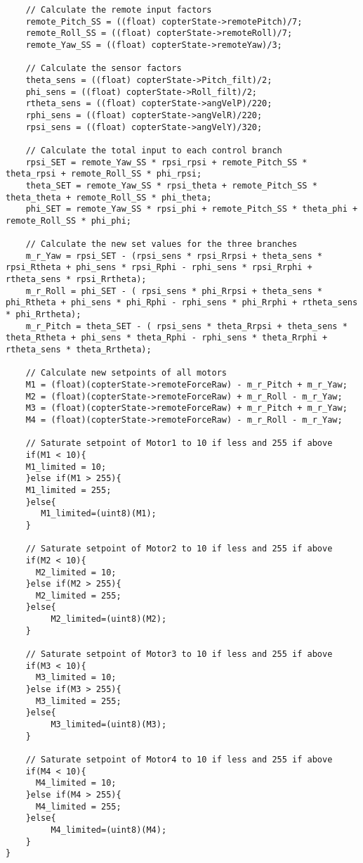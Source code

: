 \begin{lstlisting}
    // Calculate the remote input factors
    remote_Pitch_SS = ((float) copterState->remotePitch)/7;
    remote_Roll_SS = ((float) copterState->remoteRoll)/7;
    remote_Yaw_SS = ((float) copterState->remoteYaw)/3;

    // Calculate the sensor factors
    theta_sens = ((float) copterState->Pitch_filt)/2;
    phi_sens = ((float) copterState->Roll_filt)/2;
    rtheta_sens = ((float) copterState->angVelP)/220;
    rphi_sens = ((float) copterState->angVelR)/220;
    rpsi_sens = ((float) copterState->angVelY)/320;

    // Calculate the total input to each control branch
    rpsi_SET = remote_Yaw_SS * rpsi_rpsi + remote_Pitch_SS * theta_rpsi + remote_Roll_SS * phi_rpsi;
    theta_SET = remote_Yaw_SS * rpsi_theta + remote_Pitch_SS * theta_theta + remote_Roll_SS * phi_theta;
    phi_SET = remote_Yaw_SS * rpsi_phi + remote_Pitch_SS * theta_phi + remote_Roll_SS * phi_phi;

    // Calculate the new set values for the three branches
    m_r_Yaw = rpsi_SET - (rpsi_sens * rpsi_Rrpsi + theta_sens * rpsi_Rtheta + phi_sens * rpsi_Rphi - rphi_sens * rpsi_Rrphi + rtheta_sens * rpsi_Rrtheta);
    m_r_Roll = phi_SET - ( rpsi_sens * phi_Rrpsi + theta_sens * phi_Rtheta + phi_sens * phi_Rphi - rphi_sens * phi_Rrphi + rtheta_sens * phi_Rrtheta);
    m_r_Pitch = theta_SET - ( rpsi_sens * theta_Rrpsi + theta_sens * theta_Rtheta + phi_sens * theta_Rphi - rphi_sens * theta_Rrphi + rtheta_sens * theta_Rrtheta);

    // Calculate new setpoints of all motors
    M1 = (float)(copterState->remoteForceRaw) - m_r_Pitch + m_r_Yaw;
    M2 = (float)(copterState->remoteForceRaw) + m_r_Roll - m_r_Yaw;
    M3 = (float)(copterState->remoteForceRaw) + m_r_Pitch + m_r_Yaw;
    M4 = (float)(copterState->remoteForceRaw) - m_r_Roll - m_r_Yaw;

    // Saturate setpoint of Motor1 to 10 if less and 255 if above
    if(M1 < 10){
    M1_limited = 10;
    }else if(M1 > 255){
    M1_limited = 255; 
    }else{
       M1_limited=(uint8)(M1);
    }

    // Saturate setpoint of Motor2 to 10 if less and 255 if above
    if(M2 < 10){
      M2_limited = 10;
    }else if(M2 > 255){
      M2_limited = 255; 
    }else{
         M2_limited=(uint8)(M2);
    }

    // Saturate setpoint of Motor3 to 10 if less and 255 if above
    if(M3 < 10){
      M3_limited = 10;
    }else if(M3 > 255){
      M3_limited = 255; 
    }else{
         M3_limited=(uint8)(M3);
    }
    
    // Saturate setpoint of Motor4 to 10 if less and 255 if above
    if(M4 < 10){
      M4_limited = 10;
    }else if(M4 > 255){
      M4_limited = 255; 
    }else{                 
         M4_limited=(uint8)(M4);
    } 
}
\end{lstlisting}



